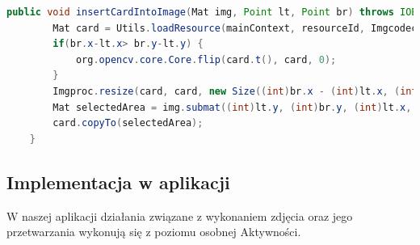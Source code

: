 \begin{lstlisting}[language=Java]
public void insertCardIntoImage(Mat img, Point lt, Point br) throws IOException {
        Mat card = Utils.loadResource(mainContext, resourceId, Imgcodecs.CV_LOAD_IMAGE_COLOR);
        if(br.x-lt.x> br.y-lt.y) {
            org.opencv.core.Core.flip(card.t(), card, 0);
        }
        Imgproc.resize(card, card, new Size((int)br.x - (int)lt.x, (int)br.y - (int)lt.y));
        Mat selectedArea = img.submat((int)lt.y, (int)br.y, (int)lt.x, (int)br.x);
        card.copyTo(selectedArea);
    }
\end{lstlisting}

\subsection{Implementacja w aplikacji}

W naszej aplikacji działania związane z wykonaniem zdjęcia oraz jego przetwarzania wykonują się z poziomu osobnej Aktywności.

